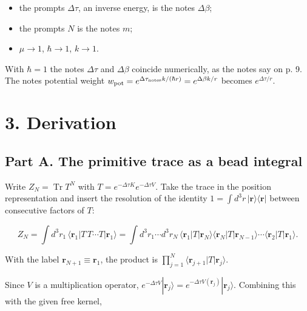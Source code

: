 \documentclass[11pt,a4paper]{article}
\newcommand{\tagmark}[1]{\marginnote{\scriptsize\ttfamily #1}}
\providecommand{\tightlist}{\setlength{\itemsep}{0pt}\setlength{\parskip}{0pt}}
\begin{document}
\begin{itemize}
\tightlist
\item
  the prompt\textquotesingle s \(\Delta\tau\), an inverse energy, is the notes\textquotesingle{} \(\Delta\beta\);
\item
  the prompt\textquotesingle s \(N\) is the notes\textquotesingle{} \(m\);
\item
  \(\mu\to1\), \(\hbar\to1\), \(k\to1\).
\end{itemize}

With \(\hbar=1\) the notes\textquotesingle{} \(\Delta\tau\) and \(\Delta\beta\) coincide numerically, as the notes say on p. 9. The notes\textquotesingle{} potential weight \(w_{\rm pot}=e^{\Delta\tau_{\rm notes}k/(\hbar r)}=e^{\Delta\beta k/r}\) becomes \(e^{\Delta\tau/r}\).

\hypertarget{derivation}{%
\section{3. Derivation}\label{derivation}}

\hypertarget{part-a.-the-primitive-trace-as-a-bead-integral}{%
\subsection{Part A. The primitive trace as a bead integral}\label{part-a.-the-primitive-trace-as-a-bead-integral}}

\tagmark{[D]} Write \(Z_N=\operatorname{Tr}T^N\) with \(T=e^{-\Delta\tau K}e^{-\Delta\tau V}\). Take the trace in the position representation and insert the resolution of the identity \(1=\int d^3r\,|\mathbf r\rangle\langle\mathbf r|\) between consecutive factors of \(T\):

\begin{equation}
Z_N=\int d^3r_1\,\langle\mathbf r_1|T\,T\cdots T|\mathbf r_1\rangle=\int d^3r_1\cdots d^3r_N\,\langle\mathbf r_1|T|\mathbf r_N\rangle\langle\mathbf r_N|T|\mathbf r_{N-1}\rangle\cdots\langle\mathbf r_2|T|\mathbf r_1\rangle .\tag{A1}
\end{equation}

With the label \(\mathbf r_{N+1}\equiv\mathbf r_1\), the product is \(\prod_{j=1}^N\langle\mathbf r_{j+1}|T|\mathbf r_j\rangle\).

\tagmark{[D]} Since \(V\) is a multiplication operator, \(e^{-\Delta\tau V}|\mathbf r_j\rangle=e^{-\Delta\tau V(\mathbf r_j)}|\mathbf r_j\rangle\). Combining this with the given free kernel,
\end{document}
